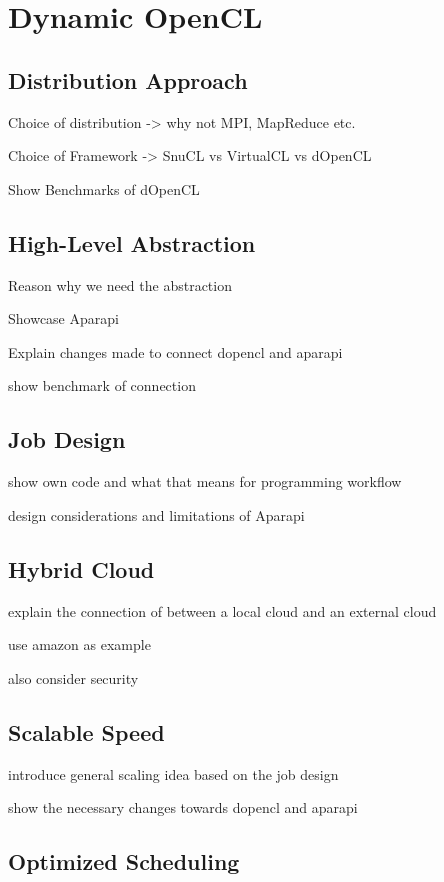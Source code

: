 
\chapter{Dynamic OpenCL}

\section{Distribution Approach}

Choice of distribution -> why not MPI, MapReduce etc.

Choice of Framework -> SnuCL vs VirtualCL vs dOpenCL

Show Benchmarks of dOpenCL

\section{High-Level Abstraction}

Reason why we need the abstraction

Showcase Aparapi

Explain changes made to connect dopencl and aparapi

show benchmark of connection

\section{Job Design}

show own code and what that means for programming workflow

design considerations and limitations of Aparapi

\section{Hybrid Cloud}

explain the connection of between a local cloud and an external cloud

use amazon as example

also consider security

\section{Scalable Speed}

introduce general scaling idea based on the job design

show the necessary changes towards dopencl and aparapi

\section{Optimized Scheduling}

